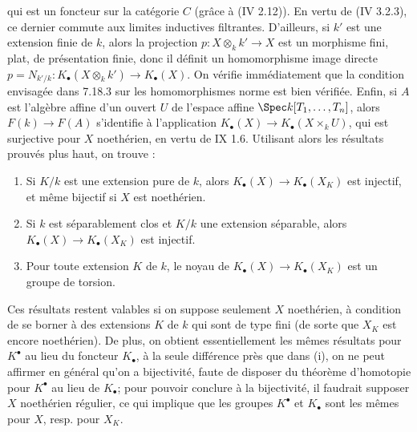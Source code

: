 
qui est un
foncteur sur la catégorie \(C\) (grâce à (IV 2.12)). En vertu de (IV 3.2.3), ce dernier commute aux limites inductives filtrantes. D'ailleurs, si \(k'\) est une extension finie de \(k\), alors la projection \(p:X\otimes_k k'\to X\) est un morphisme fini, plat, de présentation finie, donc il définit un homomorphisme image directe \(p=N_{k'/k}:K_\bullet(X\otimes_k k')\longrightarrow K_\bullet(X)\). On vérifie immédiatement que la condition envisagée dans 7.18.3 sur les homomorphismes norme est bien vérifiée. Enfin, si \(A\) est l'algèbre affine d'un ouvert \(U\) de l'espace affine \(\Spec k[T_1,\ldots,T_n]\), alors \(F(k)\to F(A)\) s'identifie à l'application \(K_\bullet(X)\longrightarrow K_\bullet(X\times_k U)\), qui est surjective pour \(X\) noethérien, en vertu de IX 1.6. Utilisant alors les résultats prouvés plus haut, on trouve :
\begin{enumerate}[label=(\roman*)]
\item Si \(K/k\) est une extension pure de \(k\), alors \(K_\bullet(X)\longrightarrow K_\bullet(X_K)\) est injectif, et même bijectif si \(X\) est noethérien.
\item Si \(k\) est séparablement clos et \(K/k\) une extension séparable, alors \(K_\bullet(X)\longrightarrow K_\bullet(X_K)\) est injectif.
\item Pour toute extension \(K\) de \(k\), le noyau de \(K_\bullet(X)\longrightarrow K_\bullet(X_K)\) est un groupe de torsion.
\end{enumerate}
Ces résultats restent valables si on suppose seulement \(X\) noethérien, à condition de se borner à des extensions \(K\) de \(k\) qui sont de type fini (de sorte que \(X_K\) est encore noethérien). De plus, on obtient essentiellement les mêmes résultats pour \(K^\bullet\) au lieu du foncteur \(K_\bullet\), à la seule différence près que dans (i), on ne peut affirmer en général qu'on a bijectivité, faute de disposer du théorème d'homotopie pour \(K^\bullet\) au lieu de \(K_\bullet\); pour pouvoir conclure à la bijectivité, il faudrait supposer \(X\) noethérien régulier, ce qui implique que les groupes \(K^\bullet\) et \(K_\bullet\) sont les mêmes pour \(X\), resp. pour \(X_K\).

